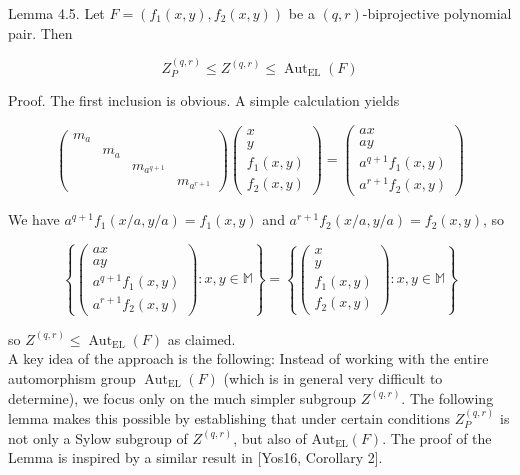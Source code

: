 \documentclass[10pt]{article}
\begin{document}
Lemma 4.5. Let $F=\left(f_{1}(x, y), f_{2}(x, y)\right)$ be a $(q, r)$-biprojective polynomial pair. Then

$$
Z_{P}^{(q, r)} \leqslant Z^{(q, r)} \leqslant \operatorname{Aut}_{\mathrm{EL}}(F)
$$

Proof. The first inclusion is obvious. A simple calculation yields

$$
\left(\begin{array}{cccc}
m_{a} & & & \\
& m_{a} & & \\
& & m_{a^{q+1}} & \\
& & & m_{a^{r+1}}
\end{array}\right)\left(\begin{array}{c}
x \\
y \\
f_{1}(x, y) \\
f_{2}(x, y)
\end{array}\right)=\left(\begin{array}{c}
a x \\
a y \\
a^{q+1} f_{1}(x, y) \\
a^{r+1} f_{2}(x, y)
\end{array}\right)
$$

We have $a^{q+1} f_{1}(x / a, y / a)=f_{1}(x, y)$ and $a^{r+1} f_{2}(x / a, y / a)=f_{2}(x, y)$, so

$$
\left\{\left(\begin{array}{c}
a x \\
a y \\
a^{q+1} f_{1}(x, y) \\
a^{r+1} f_{2}(x, y)
\end{array}\right): x, y \in \mathbb{M}\right\}=\left\{\left(\begin{array}{c}
x \\
y \\
f_{1}(x, y) \\
f_{2}(x, y)
\end{array}\right): x, y \in \mathbb{M}\right\}
$$

so $Z^{(q, r)} \leqslant \operatorname{Aut}_{\mathrm{EL}}(F)$ as claimed.\\
A key idea of the approach is the following: Instead of working with the entire automorphism group $\operatorname{Aut}_{\mathrm{EL}}(F)$ (which is in general very difficult to determine), we focus only on the much simpler subgroup $Z^{(q, r)}$. The following lemma makes this possible by establishing that under certain conditions $Z_{P}^{(q, r)}$ is not only a Sylow subgroup of $Z^{(q, r)}$, but also of $\mathrm{Aut}_{\mathrm{EL}}(F)$. The proof of the Lemma is inspired by a similar result in [Yos16, Corollary 2].
\end{document}
